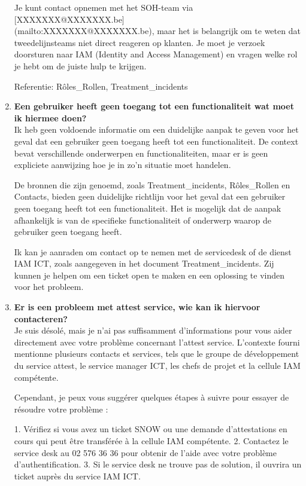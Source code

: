 \begin{enumerate}
    Je kunt contact opnemen met het SOH-team via [XXXXXXX@XXXXXXX.be]\\
    (mailto:XXXXXXX@XXXXXXX.be), maar het is belangrijk om te weten dat tweedelijnsteams niet direct reageren op klanten. Je moet je verzoek doorsturen naar IAM (Identity and Access Management) en vragen welke rol je hebt om de juiste hulp te krijgen.
    
    Referentie: Rôles\_Rollen, Treatment\_incidents
    
    
    \item \textbf{Een gebruiker heeft geen toegang tot een functionaliteit wat moet ik hiermee doen?} \\
    Ik heb geen voldoende informatie om een duidelijke aanpak te geven voor het geval dat een gebruiker geen toegang heeft tot een functionaliteit. De context bevat verschillende onderwerpen en functionaliteiten, maar er is geen expliciete aanwijzing hoe je in zo'n situatie moet handelen.
    
    De bronnen die zijn genoemd, zoals Treatment\_incidents, Rôles\_Rollen en Contacts, bieden geen duidelijke richtlijn voor het geval dat een gebruiker geen toegang heeft tot een functionaliteit. Het is mogelijk dat de aanpak afhankelijk is van de specifieke functionaliteit of onderwerp waarop de gebruiker geen toegang heeft.
    
    Ik kan je aanraden om contact op te nemen met de servicedesk of de dienst IAM ICT, zoals aangegeven in het document Treatment\_incidents. Zij kunnen je helpen om een ticket open te maken en een oplossing te vinden voor het probleem.   
    
    \item \textbf{Er is een probleem met attest service, wie kan ik hiervoor contacteren?} \\
    Je suis désolé, mais je n'ai pas suffisamment d'informations pour vous aider directement avec votre problème concernant l'attest service. L'contexte fourni mentionne plusieurs contacts et services, tels que le groupe de développement du service attest, le service manager ICT, les chefs de projet et la cellule IAM compétente.
    
    Cependant, je peux vous suggérer quelques étapes à suivre pour essayer de résoudre votre problème :
    
    1. Vérifiez si vous avez un ticket SNOW ou une demande d'attestations en cours qui peut être transférée à la cellule IAM compétente.
    2. Contactez le service desk au 02 576 36 36 pour obtenir de l'aide avec votre problème d'authentification.
    3. Si le service desk ne trouve pas de solution, il ouvrira un ticket auprès du service IAM ICT.
    

\end{enumerate}
